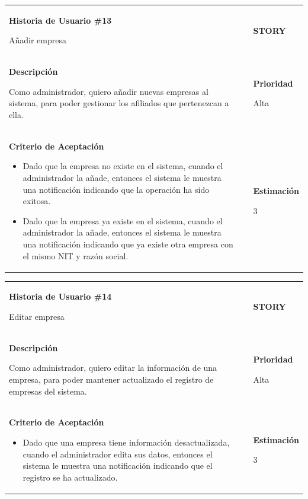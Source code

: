 \documentclass[12pt,a4paper]{article}
\begin{document}
\begin{center}
\begin{tabular}{| p{10cm} c p{2.5cm}|}
\hline 
\textbf{Historia de Usuario \#13}

Añadir empresa & & \textbf{{\Large STORY}} \\ 
\textbf{Descripción}

Como administrador, quiero añadir nuevas empresas al sistema, para
poder gestionar los afiliados que pertenezcan a ella. &  & \textbf{Prioridad}

Alta\\

\textbf{Criterio de Aceptación}

\begin{itemize}
\item Dado que la empresa no existe en el sistema, cuando el
administrador la añade, entonces el sistema le muestra una
notificación indicando que la operación ha sido exitosa.
\item Dado que la empresa ya existe en el sistema, cuando el
administrador la añade, entonces el sistema le muestra una
notificación indicando que ya existe otra empresa con el mismo
NIT y razón social.
\end{itemize} & & \textbf{Estimación}

3 \\ 
\hline 
\end{tabular}
\vspace{5mm}

\begin{tabular}{| p{10cm} c p{2.5cm}|}
\hline 
\textbf{Historia de Usuario \#14}

Editar empresa & & \textbf{{\Large STORY}} \\ 
\textbf{Descripción}

Como administrador, quiero editar la información de una empresa, para
poder mantener actualizado el registro de empresas del sistema. &  & \textbf{Prioridad}

Alta\\

\textbf{Criterio de Aceptación}

\begin{itemize}
\item Dado que una empresa tiene información desactualizada, cuando
el administrador edita sus datos, entonces el sistema le muestra
una notificación indicando que el registro se ha actualizado.
\end{itemize} & & \textbf{Estimación}

3 \\ 
\hline 
\end{tabular}
\vspace{5mm}


\end{center}
\end{document}
